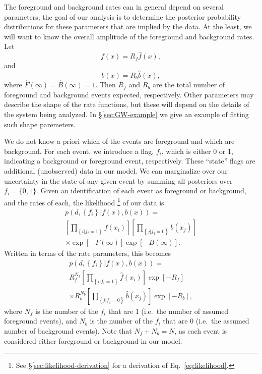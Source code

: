 \documentclass[aps,prd,reprint]{revtex4-1}
\begin{document}
The foreground and background rates can in general depend on several
parameters; the goal of our analysis is to determine the posterior
probability distributions for these parameters that are implied by the
data.  At the least, we will want to know the overall amplitude of the
foreground and background rates.  Let
\begin{equation}
  f(x) = R_f \hat{f}(x),
\end{equation}
and 
\begin{equation}
  b(x) = R_b \hat{b}(x),
\end{equation}
where $\hat{F}(\infty) = \hat{B}(\infty) = 1$.  Then $R_f$ and $R_b$
are the total number of foreground and background events expected,
respectively.  Other parameters may describe the shape of the rate
functions, but these will depend on the details of the system being
analyzed.  In \S \ref{sec:GW-example} we give an example of fitting
such shape paremeters.

We do not know a priori which of the events are foreground and which
are background.  For each event, we introduce a flag, $f_i$, which is
either 0 or 1, indicating a background or foreground event,
respectively.  These ``state'' flags are additional (unobserved) data
in our model.  We can marginalize over our uncertainty in the state of
any given event by summing all posteriors over $f_i = \{0,1\}$.  Given
an identification of each event as foreground or background, and the
rates of each, the likelihood%
\footnote{See \S \ref{sec:likelihood-derivation} for a derivation of
  Eq.~\eqref{eq:likelihood}.} %
of our data is
\begin{multline}
  \label{eq:likelihood}
  p\left( d, \left\{ f_i \right\} | f(x), b(x)
  \right) = \\ \left[ \prod_{\left\{ i | f_i = 1 \right\}} f\left( x_i
    \right) \right]  \left[ \prod_{\left\{ j | f_j = 0 \right\}}
    b\left( x_j \right) \right] \\
  \times \exp\left[ - F\left( \infty \right) \right] 
  \exp\left[ -B\left( \infty \right) \right].
\end{multline}
Written in terms of the rate parameters, this becomes
\begin{multline}
  \label{eq:likelihood-rates}
  p\left( d, \left\{ f_i \right\} | f(x), b(x)\right) = \\ R_f^{N_f}
  \left[ \prod_{\left\{ i | f_i = 1 \right\}}
    \hat{f}\left( x_i \right) \right] \exp\left[ - R_f \right] \\
  \times R_b^{N_b} \left[ \prod_{\left\{ j | f_j = 0 \right\}}
    \hat{b}\left( x_j \right) \right] \exp\left[ - R_b \right],
\end{multline}
where $N_f$ is the number of the $f_i$ that are 1 (i.e.\ the number of
assumed foreground events), and $N_b$ is the number of the $f_i$ that
are 0 (i.e.\ the assumed number of background events).  Note that $N_f
+ N_b = N$, as each event is considered either foreground or
background in our model.
\end{document}
